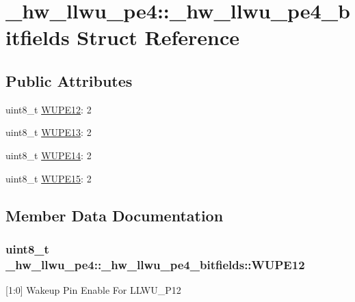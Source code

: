 \hypertarget{struct__hw__llwu__pe4_1_1__hw__llwu__pe4__bitfields}{}\section{\+\_\+hw\+\_\+llwu\+\_\+pe4\+:\+:\+\_\+hw\+\_\+llwu\+\_\+pe4\+\_\+bitfields Struct Reference}
\label{struct__hw__llwu__pe4_1_1__hw__llwu__pe4__bitfields}
\subsection*{Public Attributes}
\begin{DoxyCompactItemize}
\item 
uint8\+\_\+t \hyperlink{struct__hw__llwu__pe4_1_1__hw__llwu__pe4__bitfields_a44b3de7152a8ec07eedd8c72014891f4}{W\+U\+P\+E12}\+: 2
\item 
uint8\+\_\+t \hyperlink{struct__hw__llwu__pe4_1_1__hw__llwu__pe4__bitfields_a1e7e3046a7b70044049bd31ef5629645}{W\+U\+P\+E13}\+: 2
\item 
uint8\+\_\+t \hyperlink{struct__hw__llwu__pe4_1_1__hw__llwu__pe4__bitfields_adfd71d498c1e6849541b91b03e5c6b86}{W\+U\+P\+E14}\+: 2
\item 
uint8\+\_\+t \hyperlink{struct__hw__llwu__pe4_1_1__hw__llwu__pe4__bitfields_a908b3defdf802ad700b31f0e95dba431}{W\+U\+P\+E15}\+: 2
\end{DoxyCompactItemize}


\subsection{Member Data Documentation}
\subsubsection[{\texorpdfstring{W\+U\+P\+E12}{WUPE12}}]{\setlength{\rightskip}{0pt plus 5cm}uint8\+\_\+t \+\_\+hw\+\_\+llwu\+\_\+pe4\+::\+\_\+hw\+\_\+llwu\+\_\+pe4\+\_\+bitfields\+::\+W\+U\+P\+E12}\hypertarget{struct__hw__llwu__pe4_1_1__hw__llwu__pe4__bitfields_a44b3de7152a8ec07eedd8c72014891f4}{}\label{struct__hw__llwu__pe4_1_1__hw__llwu__pe4__bitfields_a44b3de7152a8ec07eedd8c72014891f4}
\mbox{[}1\+:0\mbox{]} Wakeup Pin Enable For L\+L\+W\+U\+\_\+\+P12 
